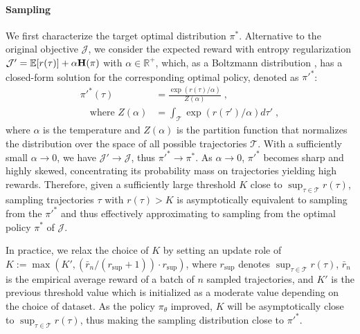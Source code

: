 \paragraph{Sampling}
\renewcommand{\cJ}{\mathcal{J}}
We first characterize the target optimal distribution $\pi^*$.
Alternative to the original objective $\mathcal{J}$, we consider the expected reward with entropy regularization $\mathcal{J}' = \mathbb{E}[r(\tau)] + \alpha \mathbf{H}(\pi)$ with $\alpha \in \mathbb{R}^+$,
which, as a Boltzmann distribution \cite{ziebart2010modeling}, has a closed-form solution for the corresponding optimal policy, denoted as ${\pi'}^*$:
\begin{equation}
    \label{eq_boltzmann_optimal} %
    \begin{aligned}
    {\pi'}^* (\tau) &= \frac{\exp (r(\tau)/\alpha)}{Z(\alpha)} \; ,  \\ \quad \text{where } Z(\alpha) &= \int_{\mathcal{T}} \exp (r(\tau')/\alpha) d\tau' \; ,
    \end{aligned}
\end{equation}
where $\alpha$ is the temperature and $Z(\alpha)$ is the partition function that normalizes the distribution over the space of all possible trajectories $\mathcal{T}$.
With a sufficiently small $\alpha \to 0$, we have $\cJ' \to \cJ$, thus ${\pi'}^* \to \pi^*$.
As $\alpha \to 0$,
${\pi'}^*$ becomes sharp and highly skewed,
concentrating its probability mass on trajectories yielding high rewards.
Therefore, given a sufficiently large threshold $K$ close to $\sup_{\tau \in \mathcal{T}} r(\tau)$,
sampling trajectories $\tau$ with $r(\tau) > K$ is asymptotically equivalent to sampling from the ${\pi'}^*$ and thus effectively approximating to sampling from the optimal policy ${\pi}^*$ of $\cJ$.

In practice, we relax the choice of $K$ by setting an update role of $K:= \max(K', (\bar{r}_n/(r_\text{sup} + 1))\cdot r_\text{sup})$, where $r_\text{sup}$ denotes $\sup_{\tau \in \mathcal{T}} r(\tau)$, $\bar{r}_n$ is the empirical average reward of a batch of $n$ sampled trajectories, and $K'$ is the previous threshold value which is initialized as a moderate value depending on the choice of dataset.
As the policy $\pi_\theta$ improved,  $K$ will be asymptotically close to $\sup_{\tau \in \mathcal{T}} r(\tau)$, thus making the sampling distribution close to ${\pi'}^*$.


